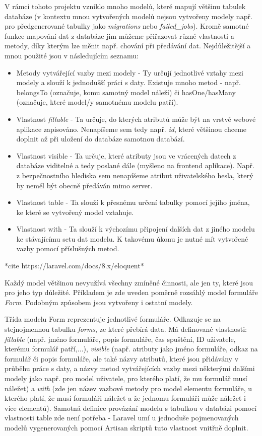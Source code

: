 	V rámci tohoto projektu vzniklo mnoho modelů, které mapují většinu tabulek databáze (v kontextu mnou vytvořených modelů nejsou vytvořeny modely např. pro předgenerované tabulky jako \textit{migrations} nebo \textit{failed\_jobs}). Kromě samotné funkce mapování dat z databáze jim můžeme přiřazovat různé vlastnosti a metody, díky kterým lze měnit např. chování při předávání dat. Nejdůležitější a mnou použité jsou v následujícím seznamu:
	
	\begin{itemize}
		\item Metody vytvářející vazby mezi modely - Ty určují jednotlivé vztahy mezi modely a slouží k jednodušší práci s daty. Existuje mnoho metod - např. belongsTo (označuje, komu samotný model náleží) či hasOne/hasMany (označuje, které model/y samotnému modelu patří).
		\item Vlastnost \textit{fillable} - Ta určuje, do kterých atributů může být na vrstvě webové aplikace zapisováno. Nenapíšeme sem tedy např. \textit{id}, které většinou chceme doplnit až při uložení do databáze samotnou databází.
		\item Vlastnost visible - Ta určuje, které atributy jsou ve vrácených datech z databáze viditelné a tedy poslané dále (myšleno na frontend aplikace). Např. z bezpečnostního hlediska sem nenapíšeme atribut uživatelského hesla, který by neměl být obecně předáván mimo server.
		\item Vlastnost table - Ta slouží k přesnému určení tabulky pomocí jejího jména, ke které se vytvořený model vztahuje.
		\item Vlastnost with - Ta slouží k výchozímu připojení dalších dat z jiného modelu ke stávajícímu setu dat modelu. K takovému úkonu je nutné mít vytvořené vazby pomocí příslušných metod.
	\end{itemize} *cite https://laravel.com/docs/8.x/eloquent*

	Každý model většinou nevyužívá všechny zmíněné činnosti, ale jen ty, které jsou pro jeho typ důležité. Příkladem je zde uveden poměrně rozsáhlý model formuláře \textit{Form}. Podobným způsobem jsou vytvořeny i ostatní modely.
	
	Třída modelu Form reprezentuje jednotlivé formuláře. Odkazuje se na stejnojmennou tabulku \textit{forms}, ze které přebírá data. Má definované vlastnosti: \textit{fillable} (např. jméno formuláře, popis formuláře, čas spuštění, ID uživatele, kterému formulář patří,...), \textit{visible} (např. atributy jako jméno formuláře, odkaz na formulář či popis formuláře, ale také názvy atributů, které jsou přidávány v průběhu práce s daty, a názvy metod vytvářejících vazby mezi některými dalšími modely jako např. pro model uživatele, pro kterého platí, že mu formulář musí náležet) a \textit{with} (zde jen název vazbové metody pro model elementu formuláře, u kterého platí, že musí formuláři náležet a že jednomu formuláři může náležet i více elementů). Samotná definice provázání modelu s tabulkou v databázi pomocí vlastnosti table zde není potřeba - Laravel umí u jednoduše pojmenovaných modelů vygenerovaných pomocí Artisan skriptů tuto vlastnost vnitřně doplnit.
	
